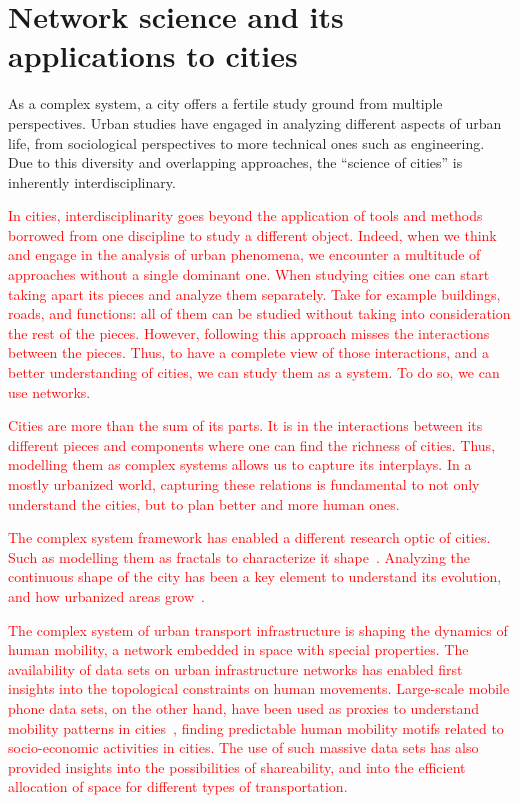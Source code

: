 \section{Network science and its applications to cities}

As a complex system, a city offers a fertile study ground from multiple perspectives. Urban studies have engaged in analyzing different aspects of urban life, from sociological perspectives to more technical ones such as engineering. Due to this diversity and overlapping approaches, the ``science of cities'' is inherently interdisciplinary.

\textcolor{red}{In cities, interdisciplinarity goes beyond the application of tools and methods borrowed from one discipline to study a different object. Indeed, when we think and engage in the analysis of urban phenomena, we encounter a multitude of approaches without a single dominant one. When studying cities one can start taking apart its pieces and analyze them separately. Take for example buildings, roads, and functions: all of them can be studied without taking into consideration the rest of the pieces. However, following this approach misses the interactions between the pieces. Thus, to have a complete view of those interactions, and a better understanding of cities, we can study them as a system. To do so, we can use networks.}

\textcolor{red}{Cities are more than the sum of its parts. It is in the interactions between its different pieces and components where one can find the richness of cities. Thus, modelling them as complex systems allows us to capture its interplays. In a mostly urbanized world, capturing these relations is fundamental to not only understand the cities, but to plan better and more human ones.}

\textcolor{red}{The complex system framework has enabled a different research optic of cities. Such as modelling them as fractals to characterize it shape~\cite{batty1996preliminary}. Analyzing the continuous shape of the city has been a key element to understand its evolution, and how urbanized areas grow~\cite{makse1995growth}.}

\textcolor{red}{The complex system of urban transport infrastructure is shaping the dynamics of human mobility, a network embedded in space with special properties. The availability of data sets on urban infrastructure networks has enabled first insights into the topological constraints on human movements. Large-scale mobile phone data sets, on the other hand, have been used as proxies to understand mobility patterns in cities~\cite{gonzalez2008understanding}, finding predictable human mobility motifs related to socio-economic activities in cities. The use of such massive data sets has also provided insights into the possibilities of shareability, and into the efficient allocation of space for different types of transportation.}



